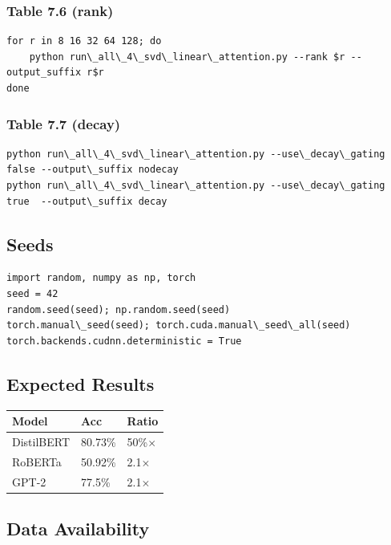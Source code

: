 \subsubsection{Table 7.6 (rank)}
\begin{lstlisting}
for r in 8 16 32 64 128; do
    python run\_all\_4\_svd\_linear\_attention.py --rank $r --output_suffix r$r
done
\end{lstlisting}

\subsubsection{Table 7.7 (decay)}
\begin{lstlisting}
python run\_all\_4\_svd\_linear\_attention.py --use\_decay\_gating false --output\_suffix nodecay
python run\_all\_4\_svd\_linear\_attention.py --use\_decay\_gating true  --output\_suffix decay
\end{lstlisting}

\subsection{Seeds}

\begin{lstlisting}
import random, numpy as np, torch
seed = 42
random.seed(seed); np.random.seed(seed)
torch.manual\_seed(seed); torch.cuda.manual\_seed\_all(seed)
torch.backends.cudnn.deterministic = True
\end{lstlisting}

\subsection{Expected Results}

\begin{table}[H]
\centering
\small
\begin{tabular}{lll}
\toprule
\textbf{Model} & \textbf{Acc} & \textbf{Ratio} \\
\midrule
DistilBERT & 80.73\% & 50\%$\times$ \\
RoBERTa & 50.92\% & 2.1$\times$ \\
GPT-2 & 77.5\% & 2.1$\times$ \\
\bottomrule
\end{tabular}
\end{table}

\subsection{Data Availability}

